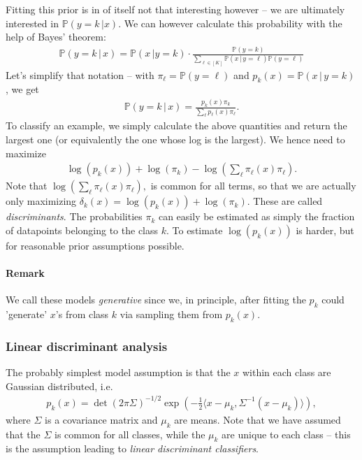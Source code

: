 \documentclass{article}
\newcommand{\sprod}[1]{\langle #1 \rangle}
\begin{document}
Fitting this prior is in of itself not that interesting however -- we are ultimately interested in $\mathbb{P}(y=k \, \vert x)$. We can however calculate this probability with the help of Bayes' theorem:
\begin{align*}
    \mathbb{P}(y=k \, \vert \, x) = \mathbb{P}(x \, \vert y=k) \cdot \frac{\mathbb{P}(y=k)}{\sum_{\ell\in [K]}\mathbb{P}(x \, \vert \, y=\ell) \mathbb{P}(y=\ell)}
\end{align*}
Let's simplify that notation -- with $\pi_\ell= \mathbb{P}(y=\ell)$ and $p_k(x) = \mathbb{P}(x \, \vert \, y=k)$, we get
\begin{align*}
    \mathbb{P}(y=k \, \vert \, x) = \frac{p_k(x) \pi_k}{\sum_\ell p_\ell(x)\pi_\ell}.
\end{align*}
To classify an example, we simply calculate the above quantities and return the largest one (or equivalently the one whose log is the largest). We hence need to maximize
\begin{align*}
    \log(p_k(x)) + \log(\pi_k) - \log\left( \sum_{\ell}\pi_\ell(x) \pi_\ell\right).
\end{align*}
Note that $\log\left( \sum_{\ell}\pi_\ell(x) \pi_\ell\right),$ is common for all terms, so that we are actually only maximizing $\delta_k(x)=\log(p_k(x))+\log(\pi_k)$. These are called \emph{discriminants}. The probabilities $\pi_k$ can easily be estimated as simply the fraction of datapoints belonging to the class $k$. To estimate $\log(p_k(x))$ is harder, but for reasonable prior assumptions possible. 

\paragraph{Remark} We call these models \emph{generative} since we, in principle, after fitting the $p_k$ could 'generate' $x$'s from class $k$ via sampling them from $p_k(x)$. 



\subsubsection{Linear discriminant analysis}  The probably simplest model assumption is that the $x$ within each class are Gaussian distributed, i.e.
\begin{align*}
    p_k(x) = \det(2\pi\Sigma)^{-1/2} \exp( -\tfrac{1}{2}\sprod{x-\mu_k,\Sigma^{-1}(x-\mu_k)}),
\end{align*}
where $\Sigma$ is a covariance matrix and $\mu_k$ are means. Note that we have assumed that the $\Sigma$ is common for all classes, while the $\mu_k$ are unique to each class -- this is the assumption leading to \emph{linear discriminant classifiers}.
\end{document}
